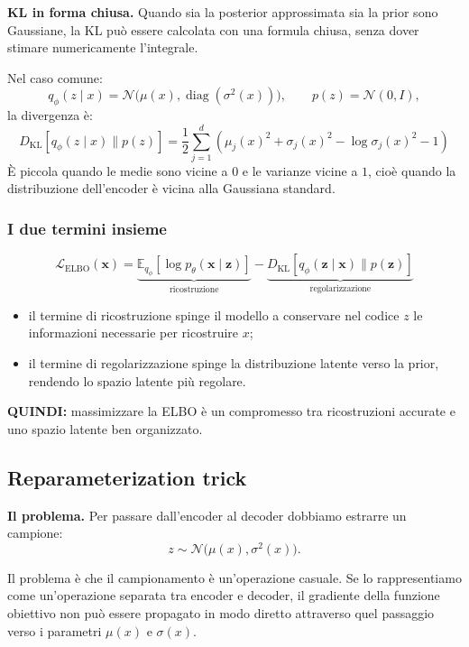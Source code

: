 \documentclass[11pt,a4paper]{article}
\providecommand{\E}{\mathbb{E}}
\providecommand{\DKL}{D_{\mathrm{KL}}}
\providecommand{\Normal}{\mathcal{N}}
\begin{document}
\textbf{KL in forma chiusa.} Quando sia la posterior approssimata sia la prior sono Gaussiane, la KL può essere calcolata con una formula chiusa, senza dover stimare numericamente l'integrale.

Nel caso comune:
\[
q_\phi(z\mid x)
=
\Normal\big(\mu(x),\operatorname{diag}(\sigma^2(x))\big),
\qquad
p(z)=\Normal(0,I),
\]
la divergenza è:
\[
\boxed{
\DKL[q_\phi(z\mid x)\|p(z)]
=
\frac{1}{2}\sum_{j=1}^{d}
\left(
\mu_j(x)^2+\sigma_j(x)^2
-\log\sigma_j(x)^2-1
\right)
}
\]
È piccola quando le medie sono vicine a $0$ e le varianze vicine a $1$, cioè quando 
la distribuzione dell'encoder è vicina alla Gaussiana standard.

\subsubsection{I due termini insieme}
\[
\mathcal{L}_{\mathrm{ELBO}}(\mathbf{x})=
\underbrace{\E_{q_\phi}[\log p_\theta(\mathbf{x}\mid\mathbf{z})]}_{\text{ricostruzione}}
-\underbrace{\DKL[q_\phi(\mathbf{z}\mid\mathbf{x})\|p(\mathbf{z})]}_{\text{regolarizzazione}}
\]
\begin{itemize}
    \item il termine di ricostruzione spinge il modello a conservare nel codice $z$ le informazioni necessarie per ricostruire $x$;
    \item il termine di regolarizzazione spinge la distribuzione latente verso la prior, rendendo lo spazio latente più regolare.
\end{itemize}

\textbf{QUINDI:} massimizzare la ELBO è un compromesso tra ricostruzioni accurate
e uno spazio latente ben organizzato.

\subsection{Reparameterization trick}

\textbf{Il problema.} Per passare dall'encoder al decoder dobbiamo estrarre un campione:
\[
z\sim
\Normal\big(\mu(x),\sigma^2(x)\big).
\]

Il problema è che il campionamento è un'operazione casuale. Se lo rappresentiamo come un'operazione separata tra encoder e decoder, 
il gradiente della funzione obiettivo non può essere propagato in modo diretto attraverso quel passaggio verso i parametri $\mu(x)$ e $\sigma(x)$.
\end{document}
